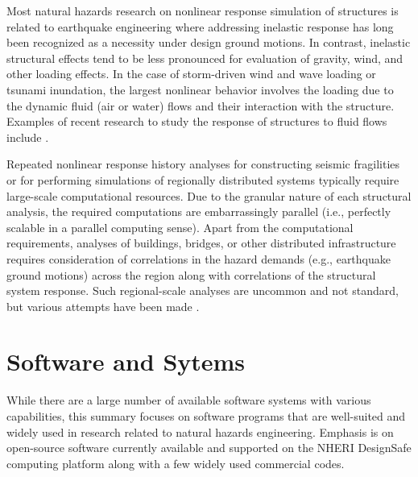 Most natural hazards research on nonlinear response simulation of structures is related to earthquake engineering where addressing inelastic response has long been recognized as a necessity under design ground motions. In contrast, inelastic structural effects tend to be less pronounced for evaluation of gravity, wind, and other loading effects. In the case of storm-driven wind and wave loading or tsunami inundation, the largest nonlinear behavior involves the loading due to the dynamic fluid (air or water) flows and their interaction with the structure. Examples of recent research to study the response of structures to fluid flows include \cite{minjie2014modeling, minjie2018validation, ataei2015fragility, petrone2017fragility, madurapperuma2013response, attary2016methodology}.

Repeated nonlinear response history analyses for constructing seismic fragilities or for performing simulations of regionally distributed systems typically require large-scale computational resources. Due to the granular nature of each structural analysis, the required computations are embarrassingly parallel (i.e., perfectly scalable in a parallel computing sense). Apart from the computational requirements, analyses of buildings, bridges, or other distributed infrastructure requires consideration of correlations in the hazard demands (e.g., earthquake ground motions) across the region along with correlations of the structural system response. Such regional-scale analyses are uncommon and not standard, but various attempts have been made \citep[see e.g.][]{miller2015estimating}.

\section{Software and Sytems}
\label{sec:resp_struct_tools}

While there are a large number of available software systems with various capabilities, this summary focuses on software programs that are well-suited and widely used in research related to natural hazards engineering. Emphasis is on open-source software currently available and supported on the NHERI DesignSafe computing platform along with a few widely used commercial codes.

